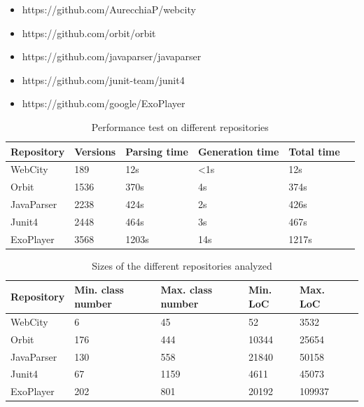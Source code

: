 \documentclass[]{usiinfbachelorproject}
\begin{document}
\begin{itemize}
    \item https://github.com/AurecchiaP/webcity
    \item https://github.com/orbit/orbit
    \item https://github.com/javaparser/javaparser
    \item https://github.com/junit-team/junit4
    \item https://github.com/google/ExoPlayer
\end{itemize}

\begin{table}[H]
    \begin{center}
        \begin{tabular}{ | l | l | l | l | l | l |}
        \hline
        Repository & Versions & Parsing time & Generation time & Total time \\ \hline
        WebCity & 189 & 12s & <1s & 12s \\ \hline
        Orbit & 1536 & 370s & 4s & 374s \\ \hline
        JavaParser & 2238 & 424s & 2s & 426s \\ \hline
        Junit4 & 2448 & 464s & 3s & 467s \\ \hline
        ExoPlayer & 3568 & 1203s & 14s & 1217s \\ \hline
        \end{tabular}
    \end{center}
    \caption{Performance test on different repositories}
    \label{tab:performance}
\end{table}



\begin{table}[H]
    \begin{center}
        \begin{tabular}{ | l | l | l | l | l | l |}
        \hline
        Repository & Min. class number & Max. class number & Min. LoC & Max. LoC \\ \hline
        WebCity & 6 & 45 & 52 & 3532 \\ \hline
        Orbit & 176 & 444 & 10344 & 25654 \\ \hline
        JavaParser & 130 & 558 & 21840 & 50158 \\ \hline
        Junit4 & 67 & 1159 & 4611 & 45073 \\ \hline
        ExoPlayer & 202 & 801 & 20192 & 109937 \\ \hline
        \end{tabular}
    \end{center}
    \caption{Sizes of the different repositories analyzed}
    \label{tab:performance}
\end{table}
\end{document}
